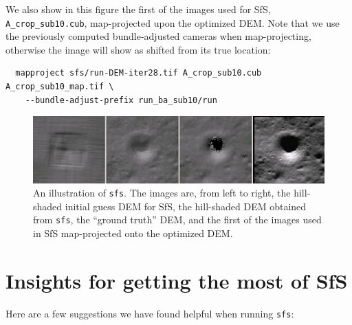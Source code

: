 We also show in this figure the first of the images used for SfS,
\verb#A_crop_sub10.cub#, map-projected upon the optimized DEM. Note that
we use the previously computed bundle-adjusted cameras when
map-projecting, otherwise the image will show as shifted from its true
location:
\begin{verbatim}
  mapproject sfs/run-DEM-iter28.tif A_crop_sub10.cub A_crop_sub10_map.tif \
    --bundle-adjust-prefix run_ba_sub10/run
\end{verbatim}
\begin{figure}[h!]
\begin{center}
\includegraphics[width=7in]{images/sfs2.jpg}
\caption[sfs]{An illustration of \texttt{sfs}. The images are, from
  left to right, the hill-shaded initial guess DEM for SfS, the hill-shaded DEM obtained
from \texttt{sfs}, the ``ground truth'' DEM, and the first of the
images used in SfS map-projected onto the optimized DEM.}
\label{fig:sfs2}
\end{center}
\end{figure}

\section{Insights for getting the most of SfS}
\label{sfs:insights}

Here are a few suggestions we have found helpful when running \texttt{sfs}:

